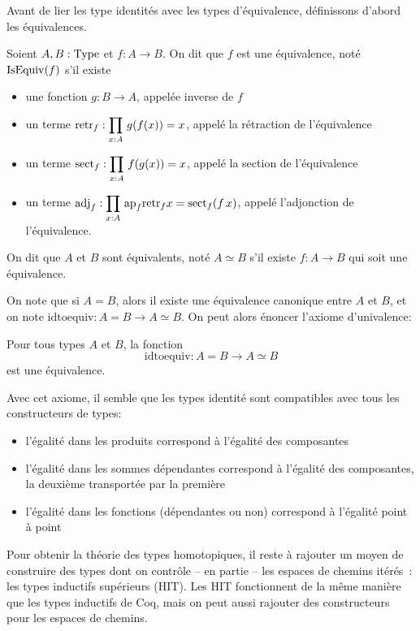 \begin{otherlanguage}{french}
Avant de lier les
type identités avec les types d'équivalence, définissons d'abord les
équivalences.
\begin{defifr}
  Soient $A,B:\operatorname{Type}$ et $f:A\to B$. On dit que $f$ est une
  équivalence, noté $\operatorname{IsEquiv}(f)$ s'il existe
  \begin{itemize}
  \item une fonction $g:B\to A$, appelée inverse de $f$
  \item un terme $\displaystyle{\mathrm{retr}_f: \prod_{x:A}\, g(f(x)) = x}$,
    appelé la rétraction de l'équivalence
  \item un terme $\displaystyle{\mathrm{sect}_f: \prod_{x:A}\, f(g(x)) = x}$,
    appelé la section de l'équivalence
  \item un terme $\displaystyle{\mathrm{adj}_f: \prod_{x:A}\, \mathrm{ap}_{f} {\mathrm{retr}_f x} =
        \mathrm{sect}_f(f\, x)}$, appelé l'adjonction de l'équivalence.
  \end{itemize}
  On dit que $A$ et $B$ sont équivalents, noté $A\simeq B$ s'il existe
  $f:A\to B$ qui soit une équivalence. 
\end{defifr} 

On note que si $A=B$, alors il existe une équivalence canonique entre
$A$ et $B$, et on note $\mathrm{idtoequiv}:A = B \to A \simeq B$.
On peut alors énoncer l'axiome d'univalence:
\begin{axfr}
  Pour tous types $A$ et $B$, la fonction
  \[ \mathrm{idtoequiv} : A = B \to A\simeq B \]
  est une équivalence.
\end{axfr}
 
Avec cet axiome, il semble que les types identité sont compatibles
avec tous les constructeurs de types: 
\begin{itemize}
\item l'égalité dans les produits correspond à l'égalité des
  composantes
\item l'égalité dans les sommes dépendantes correspond à l'égalité
  des composantes, la deuxième transportée par la première
\item l'égalité dans les fonctions (dépendantes ou non) correspond à
  l'égalité point à point
\end{itemize}

Pour obtenir la théorie des types homotopiques, il reste à rajouter un
moyen de construire des types dont on contrôle -- en partie -- les
espaces de chemins itérés~: les types inductifs supérieurs (HIT). Les
HIT fonctionnent de la même manière que les types inductifs de Coq,
mais on peut aussi rajouter des constructeurs pour les espaces de
chemins.


\end{otherlanguage}
